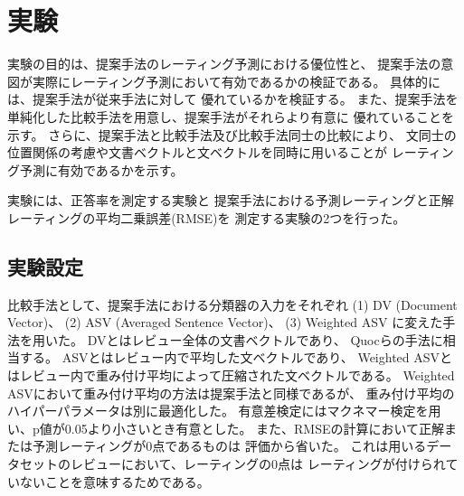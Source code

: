 \section{実験} \label{sec:Experiments}

実験の目的は、提案手法のレーティング予測における優位性と、
提案手法の意図が実際にレーティング予測において有効であるかの検証である。
具体的には、提案手法が従来手法\cite{fujitani15}に対して
優れているかを検証する。
また、提案手法を単純化した比較手法を用意し、提案手法がそれらより有意に
優れていることを示す。
さらに、提案手法と比較手法及び比較手法同士の比較により、
文同士の位置関係の考慮や文書ベクトルと文ベクトルを同時に用いることが
レーティング予測に有効であるかを示す。

実験には、正答率を測定する実験と
提案手法における予測レーティングと正解レーティングの平均二乗誤差(RMSE)を
測定する実験の2つを行った。


\subsection{実験設定}

比較手法として、提案手法における分類器の入力をそれぞれ
(1) DV (Document Vector)、
(2) ASV (Averaged Sentence Vector)、
(3) Weighted ASV
に変えた手法を用いた。
DVとはレビュー全体の文書ベクトルであり、
Quocら\cite{quoc14}の手法に相当する。
ASVとはレビュー内で平均した文ベクトルであり、
Weighted ASVとはレビュー内で重み付け平均によって圧縮された文ベクトルである。
Weighted ASVにおいて重み付け平均の方法は提案手法と同様であるが、
重み付け平均のハイパーパラメータは別に最適化した。
有意差検定にはマクネマー検定を用い、p値が0.05より小さいとき有意とした。
また、RMSEの計算において正解または予測レーティングが0点であるものは
評価から省いた。
これは用いるデータセットのレビューにおいて、レーティングの0点は
レーティングが付けられていないことを意味するためである。

